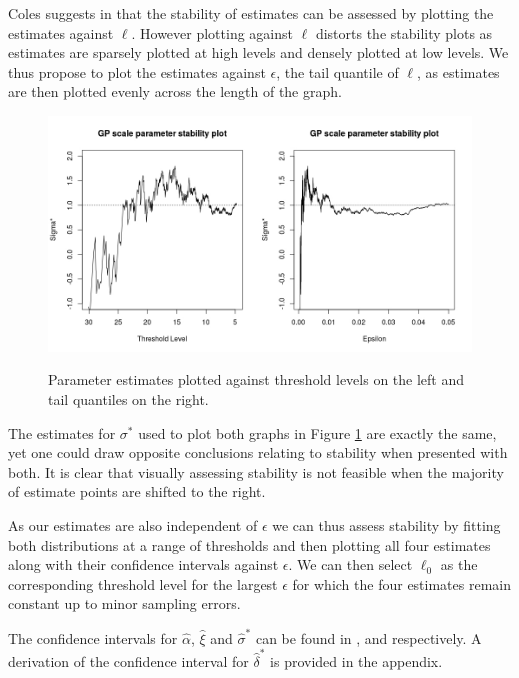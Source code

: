 \documentclass[honours,12pt]{unswthesis}
\newcommand{\1}{\mathbf 1}
\numberwithin{equation}{section}
\theoremstyle{definition}
\theoremstyle{remark}
\begin{document}
Coles suggests in \cite{ColesBook} that the stability of estimates can be assessed by plotting the estimates against $\ell$. However plotting against $\ell$ distorts the stability plots as estimates are sparsely plotted at high levels and densely plotted at low levels. We thus propose to plot the estimates against $\epsilon$, the tail quantile of $\ell$, as estimates are then plotted evenly across the length of the graph.


	\begin{figure}[h]
        \centering
        \includegraphics[width=\textwidth]{Figures/ThresholdVsEpsilon}
        \label{fig:comparison}
        \caption{Parameter estimates plotted against threshold levels on the left and tail quantiles on the right.}
    \end{figure}

The estimates for $\sigma^{*}$ used to plot both graphs in Figure \ref{fig:comparison} are exactly the same, yet one could draw opposite conclusions relating to stability when presented with both. It is clear that visually assessing stability is not feasible when the majority of estimate points are shifted to the right.

As our estimates are also independent of $\epsilon$ we can thus assess stability by fitting both distributions at a range of thresholds and then plotting all four estimates along with their confidence intervals against $\epsilon$. We can then select $\ell_0$ as the corresponding threshold level for the largest $\epsilon$ for which the four estimates remain constant up to minor sampling errors.

The confidence intervals for $\hat\alpha$, $\hat\xi$ and $\hat\sigma^{*}$ can be found in \cite{Cahoy2013}, \cite{Zhang2007} and \cite{ColesBook} respectively. A derivation of the confidence interval for $\hat\delta^{*}$ is provided in the appendix.
\end{document}
